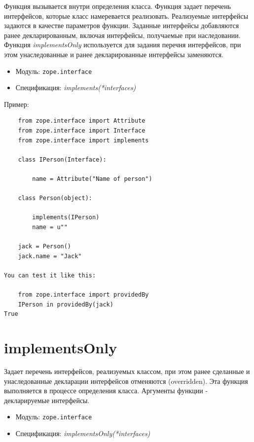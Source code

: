 \documentclass[a4paper,openany,twoside,draft]{book}
\providecommand*{\DUroletitlereference}[1]{\textsl{#1}}
\begin{document}
Функция вызывается внутри определения класса.  Функция задает перечень интерфейсов, которые класс намеревается реализовать.  Реализуемые интерфейсы задаются в качестве параметров функции.  Заданные интерфейсы добавляются ранее декларированным, включая интерфейсы, получаемые при наследовании.  Функция \DUroletitlereference{implementsOnly} используется для задания перечня интерфейсов, при этом унаследованные и ранее декларированные интерфейсы заменяются.

\begin{itemize}

\item Модуль: \texttt{zope.interface}

\item Спецификация: \DUroletitlereference{implements(*interfaces)}

\end{itemize}

Пример:

\begin{verbatim}
    from zope.interface import Attribute
    from zope.interface import Interface
    from zope.interface import implements

    class IPerson(Interface):

        name = Attribute("Name of person")

    class Person(object):

        implements(IPerson)
        name = u""

    jack = Person()
    jack.name = "Jack"

You can test it like this:

    from zope.interface import providedBy
    IPerson in providedBy(jack)
True
\end{verbatim}


\section*{implementsOnly%
  \label{implementsonly}%
}

Задает перечень интерфейсов, реализуемых классом, при этом ранее сделанные и унаследованные декларации интерфейсов отменяются (overridden).  Эта функция выполняется в процессе определения класса.  Аргументы функции - декларируемые интерфейсы.

\begin{itemize}

\item Модуль: \texttt{zope.interface}

\item Спецификация: \DUroletitlereference{implementsOnly(*interfaces)}

\end{itemize}
\end{document}
